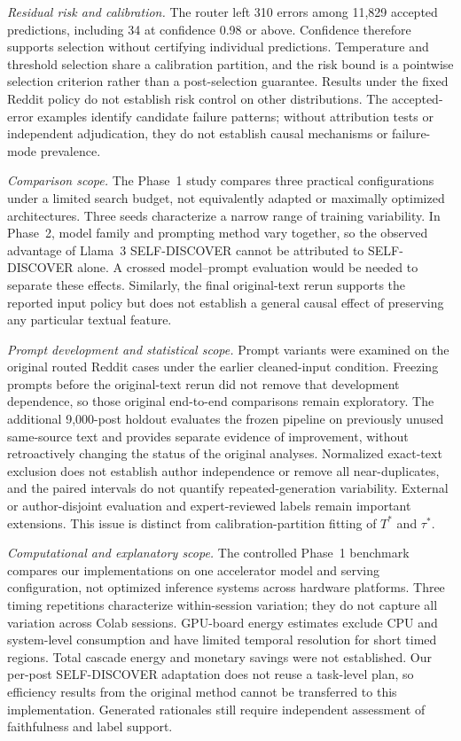 \documentclass{ieeeaccess}
\begin{document}
\textit{Residual risk and calibration.} The router left 310 errors among 11,829 accepted predictions, including 34 at confidence 0.98 or above. Confidence therefore supports selection without certifying individual predictions. Temperature and threshold selection share a calibration partition, and the risk bound is a pointwise selection criterion rather than a post-selection guarantee. Results under the fixed Reddit policy do not establish risk control on other distributions. The accepted-error examples identify candidate failure patterns; without attribution tests or independent adjudication, they do not establish causal mechanisms or failure-mode prevalence.

\textit{Comparison scope.} The Phase~1 study compares three practical configurations under a limited search budget, not equivalently adapted or maximally optimized architectures. Three seeds characterize a narrow range of training variability. In Phase~2, model family and prompting method vary together, so the observed advantage of Llama~3 SELF-DISCOVER cannot be attributed to SELF-DISCOVER alone. A crossed model--prompt evaluation would be needed to separate these effects. Similarly, the final original-text rerun supports the reported input policy but does not establish a general causal effect of preserving any particular textual feature.

\textit{Prompt development and statistical scope.} Prompt variants were examined on the original routed Reddit cases under the earlier cleaned-input condition. Freezing prompts before the original-text rerun did not remove that development dependence, so those original end-to-end comparisons remain exploratory. The additional 9,000-post holdout evaluates the frozen pipeline on previously unused same-source text and provides separate evidence of improvement, without retroactively changing the status of the original analyses. Normalized exact-text exclusion does not establish author independence or remove all near-duplicates, and the paired intervals do not quantify repeated-generation variability. External or author-disjoint evaluation and expert-reviewed labels remain important extensions. This issue is distinct from calibration-partition fitting of $T^*$ and $\tau^*$.

\textit{Computational and explanatory scope.} The controlled Phase~1 benchmark compares our implementations on one accelerator model and serving configuration, not optimized inference systems across hardware platforms. Three timing repetitions characterize within-session variation; they do not capture all variation across Colab sessions. GPU-board energy estimates exclude CPU and system-level consumption and have limited temporal resolution for short timed regions. Total cascade energy and monetary savings were not established. Our per-post SELF-DISCOVER adaptation does not reuse a task-level plan, so efficiency results from the original method cannot be transferred to this implementation. Generated rationales still require independent assessment of faithfulness and label support.
\end{document}
